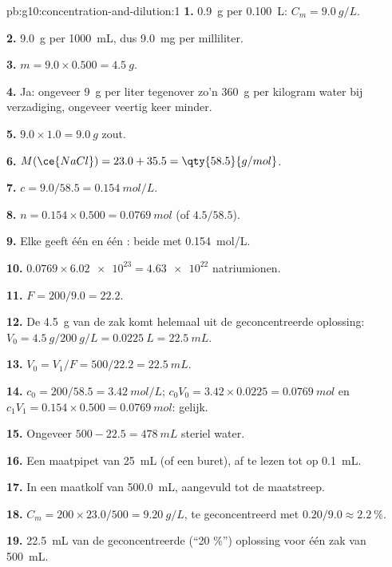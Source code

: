 \begin{solution}{pb:g10:concentration-and-dilution:1}
\textbf{1.} \qty{0.9}{g} per \qty{0.100}{L}: $C_m = \qty{9.0}{g/L}$.

\textbf{2.} \qty{9.0}{g} per \qty{1000}{mL}, dus \qty{9.0}{mg} per
milliliter.

\textbf{3.} $m = 9.0 \times 0.500 = \qty{4.5}{g}$.

\textbf{4.} Ja: ongeveer \qty{9}{g} per liter tegenover zo'n \qty{360}{g}
per kilogram water bij verzadiging, ongeveer veertig keer minder.

\textbf{5.} $9.0 \times 1.0 = \qty{9.0}{g}$ zout.

\textbf{6.} $M(\ce{NaCl}) = 23.0 + 35.5 = \qty{58.5}{g/mol}$.

\textbf{7.} $c = 9.0 / 58.5 = \qty{0.154}{mol/L}$.

\textbf{8.} $n = 0.154 \times 0.500 = \qty{0.0769}{mol}$ (of
$4.5 / 58.5$).

\textbf{9.} Elke  geeft één  en één : beide met
\qty{0.154}{mol/L}.

\textbf{10.} $0.0769 \times \num{6.02e23} = \num{4.63e22}$ natriumionen.

\textbf{11.} $F = 200 / 9.0 = 22.2$.

\textbf{12.} De \qty{4.5}{g} van de zak komt helemaal uit de
geconcentreerde oplossing: $V_0 = \qty{4.5}{g} / \qty{200}{g/L} = \qty{0.0225}{L} =
\qty{22.5}{mL}$.

\textbf{13.} $V_0 = V_1 / F = 500 / 22.2 = \qty{22.5}{mL}$.

\textbf{14.} $c_0 = 200 / 58.5 = \qty{3.42}{mol/L}$;
$c_0 V_0 = 3.42 \times 0.0225 = \qty{0.0769}{mol}$ en
$c_1 V_1 = 0.154 \times 0.500 = \qty{0.0769}{mol}$: gelijk.

\textbf{15.} Ongeveer $500 - 22.5 = \qty{478}{mL}$ steriel water.

\textbf{16.} Een maatpipet van \qty{25}{mL} (of een buret), af te lezen
tot op \qty{0.1}{mL}.

\textbf{17.} In een maatkolf van \qty{500.0}{mL}, aangevuld tot de
maatstreep.

\textbf{18.} $C_m = 200 \times 23.0 / 500 = \qty{9.20}{g/L}$, te
geconcentreerd met $0.20 / 9.0 \approx \qty{2.2}{\percent}$.

\textbf{19.} \qty{22.5}{mL} van de geconcentreerde (``20 \%'') oplossing
voor één zak van \qty{500}{mL}.
\end{solution}
